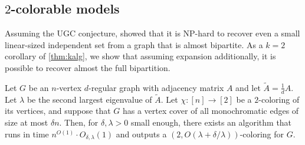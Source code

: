 \subsection{$2$-colorable models}


Assuming the UGC conjecture, \cite{MR2648426} showed that it is NP-hard to recover even a small linear-sized independent set from a graph that is almost bipartite. As a $k=2$ corollary of \cref{thm:kalg}, we show that assuming expansion additionally, it is possible to recover almost the full bipartition.


\begin{theorem}
\label{thm:2alg}
Let $G$ be an $n$-vertex $d$-regular graph with adjacency matrix $A$ and let $\tilde{A} = \frac{1}{d}A$.
Let $\lambda$ be the second largest eigenvalue of $\tilde{A}$.
Let $\chi: [n] \to [2]$ be a $2$-coloring of its vertices, and suppose that $G$ has a vertex cover of all monochromatic edges of size at most $\delta n$.
Then, for $\delta, \lambda > 0$ small enough, there exists an algorithm that runs in time $n^{O(1)} \cdot O_{\delta,\lambda}(1)$ and outputs a $(2, O(\lambda+\delta/\lambda))$-coloring for $G$.
\end{theorem}
